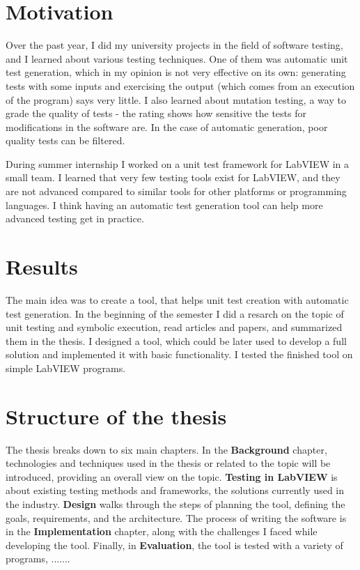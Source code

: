 \section{Motivation}
Over the past year, I did my university projects in the field of software testing, and I learned about various testing techniques. One of them was automatic unit test generation, which in my opinion is not very effective on its own: generating tests with some inputs and exercising the output (which comes from an execution of the program) says very little. I also learned about mutation testing, a way to grade the quality of tests - the rating shows how sensitive the tests for modifications in the software are. In the case of automatic generation, poor quality tests can be filtered.

During summer internship I worked on a unit test framework for LabVIEW in a small team. I learned that very few testing tools exist for LabVIEW, and they are not advanced compared to similar tools for other platforms or programming languages. I think having an automatic test generation tool can help more advanced testing get in practice.


\section{Results}
The main idea was to create a tool, that helps unit test creation with automatic test generation. In the beginning of the semester I did a resarch on the topic of unit testing and symbolic execution, read articles and papers, and summarized them in the thesis. I designed a tool, which could be later used to develop a full solution and implemented it with basic functionality. I tested the finished tool on simple LabVIEW programs.
\section{Structure of the thesis}
The thesis breaks down to six main chapters. In the \textbf{Background} chapter, technologies and techniques used in the thesis or related to the topic will be introduced, providing an overall view on the topic. \textbf{Testing in LabVIEW} is about existing testing methods and frameworks, the solutions currently used in the industry. \textbf{Design} walks through the steps of planning the tool, defining the goals, requirements, and the architecture. The process of writing the software is in the \textbf{Implementation} chapter, along with the challenges I faced while developing the tool. Finally, in \textbf{Evaluation}, the tool is tested with a variety of programs, .......
\pagebreak